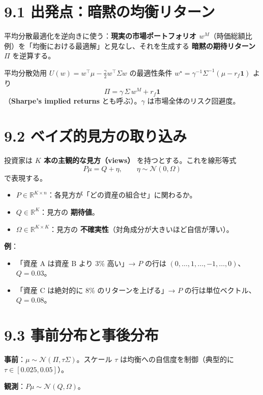 \documentclass[11pt,a4paper]{report}
\begin{document}
\section{9.1 出発点：暗黙の均衡リターン}

平均分散最適化を逆向きに使う：\textbf{現実の市場ポートフォリオ $w^M$}（時価総額比例）を「均衡における最適解」と見なし、それを生成する \textbf{暗黙の期待リターン} $\Pi$ を逆算する。

平均分散効用 $U(w) = w^\top\mu - \tfrac{\gamma}{2} w^\top \Sigma w$ の最適性条件 $w^\star = \gamma^{-1} \Sigma^{-1} (\mu - r_f\mathbf{1})$ より \[ \boxed{\; \Pi = \gamma\, \Sigma\, w^M + r_f \mathbf{1} \;} \] （\textbf{Sharpe’s implied returns} とも呼ぶ）。$\gamma$ は市場全体のリスク回避度。

\section{9.2 ベイズ的見方の取り込み}

投資家は \textbf{$K$ 本の主観的な見方（views）} を持つとする。これを線形等式 \[ P \mu = Q + \eta, \qquad \eta \sim \mathcal{N}(0, \Omega) \] で表現する。
\begin{itemize}
\item $P \in \mathbb{R}^{K\times n}$：各見方が「どの資産の組合せ」に関わるか。
\item $Q \in \mathbb{R}^K$：見方の \textbf{期待値}。
\item $\Omega \in \mathbb{R}^{K\times K}$：見方の \textbf{不確実性}（対角成分が大きいほど自信が薄い）。
\end{itemize}

\textbf{例}：
\begin{itemize}
\item 「資産 A は資産 B より 3\% 高い」→ $P$ の行は $(0, \dots, 1, \dots, -1, \dots, 0)$、$Q = 0.03$。
\item 「資産 C は絶対的に 8\% のリターンを上げる」→ $P$ の行は単位ベクトル、$Q = 0.08$。
\end{itemize}

\section{9.3 事前分布と事後分布}

\textbf{事前}：$\mu \sim \mathcal{N}(\Pi, \tau \Sigma)$。スケール $\tau$ は均衡への自信度を制御（典型的に $\tau \in [0.025, 0.05]$）。

\textbf{観測}：$P \mu \sim \mathcal{N}(Q, \Omega)$。
\end{document}
